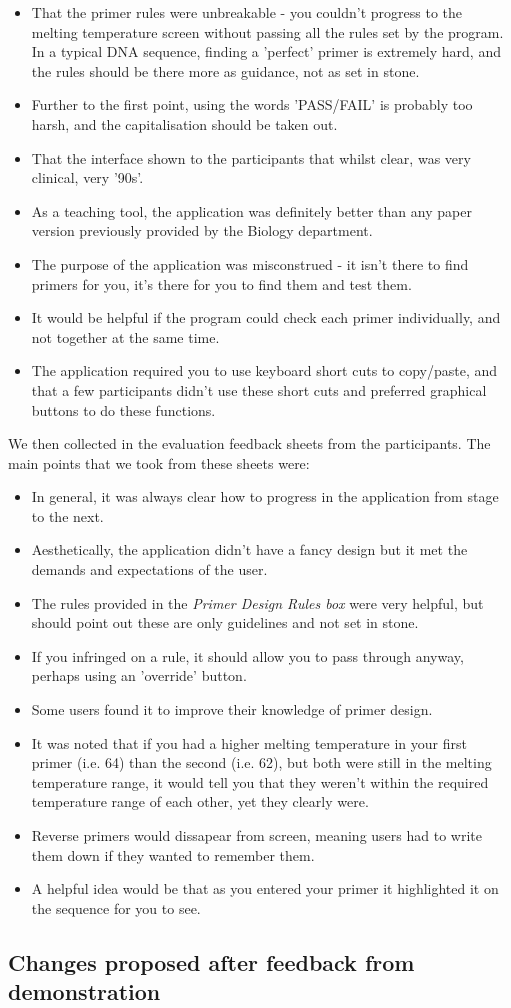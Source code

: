 \begin{itemize}

\item That the primer rules were unbreakable - you couldn't progress to the melting temperature screen without passing all the rules set by the program. In a typical DNA sequence, finding a 'perfect' primer is extremely hard, and the rules should be there more as guidance, not as set in stone.
\item Further to the first point, using the words 'PASS/FAIL' is probably too harsh, and the capitalisation should be taken out.
\item That the interface shown to the participants that whilst clear, was very clinical, very '90s'.
\item As a teaching tool, the application was definitely better than any paper version previously provided by the Biology department.
\item The purpose of the application was misconstrued - it isn't there to find primers for you, it's there for you to find them and test them.
\item It would be helpful if the program could check each primer individually, and not together at the same time.
\item The application required you to use keyboard short cuts to copy/paste, and that a few participants didn't use these short cuts and preferred graphical buttons to do these functions.
\end{itemize}

We then collected in the evaluation feedback sheets from the participants. The main points that we took from these sheets were:

\begin{itemize}

\item In general, it was always clear how to progress in the application from stage to the next.
\item Aesthetically, the application didn't have a fancy design but it met the demands and expectations of the user.
\item The rules provided in the \emph{Primer Design Rules box} were very helpful, but should point out these are only guidelines and not set in stone.
\item If you infringed on a rule, it should allow you to pass through anyway, perhaps using an 'override' button.
\item Some users found it to improve their knowledge of primer design.
\item It was noted that if you had a higher melting temperature in your first primer (i.e. 64) than the second (i.e. 62), but both were still in the melting temperature range, it would tell you that they weren't within the required temperature range of each other, yet they clearly were.
\item Reverse primers would dissapear from screen, meaning users had to write them down if they wanted to remember them.
\item A helpful idea would be that as you entered your primer it highlighted it on the sequence for you to see.

\end{itemize}

\subsection{Changes proposed after feedback from demonstration} 
